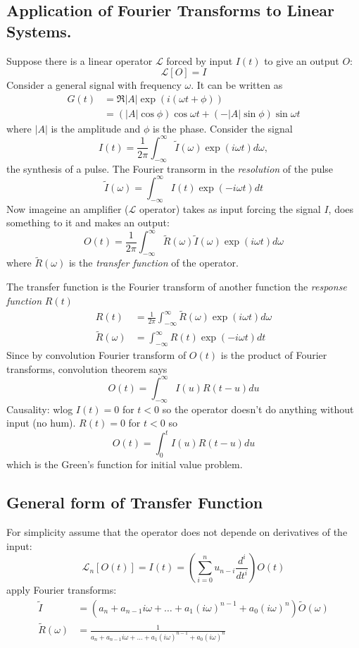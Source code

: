 \documentclass[a4paper]{article}
\renewcommand*{\L}{\mathcal{L}}
\newcommand*{\ft}{\tilde}
\begin{document}
\subsection{Application of Fourier Transforms to Linear Systems.}

Suppose there is a linear operator \(\L\) forced by input \(I(t)\) to give an output \(O\):
\[
  \L[O] = I
\]
Consider a general signal with frequency \(\omega\). It can be written as
\begin{align*}
  G(t) &= \Re |A| \exp(i(\omega t + \phi)) \\
       &= (|A| \cos \phi) \cos \omega t + (- |A| \sin \phi) \sin \omega t
\end{align*}
where \(|A|\) is the amplitude and \(\phi\) is the phase. Consider the signal
\[
  I(t) = \frac{1}{2\pi} \int_{-\infty}^{\infty} \ft I(\omega) \exp(i\omega t) d\omega,
\]
the synthesis of a pulse. The Fourier transorm in the \emph{resolution} of the pulse
\[
  \ft I(\omega) = \int_{-\infty}^{\infty} I(t) \exp(-i\omega t) dt
\]
Now imageine an amplifier (\(\L\) operator) takes as input forcing the signal \(I\), does something to it and makes an output:
\[
  O(t) = \frac{1}{2\pi} \int_{-\infty}^{\infty} \ft R(\omega) \ft I(\omega) \exp(i\omega t) d\omega
\]
where \(\ft R(\omega)\) is the \emph{transfer function} of the operator.

The transfer function is the Fourier transform of another function the \emph{response function} \(R(t)\)
\begin{align*}
  R(t) &= \frac{1}{2\pi} \int_{-\infty}^{\infty} \ft R(\omega) \exp(i\omega t) d\omega \\
  \ft R(\omega) &= \int_{-\infty}^{\infty} R(t) \exp(-i\omega t) dt
\end{align*}
Since by convolution Fourier transform of \(O(t)\) is the product of Fourier transforms, convolution theorem says
\[
  O(t) = \int_{-\infty}^{\infty} I(u) R(t - u) du
\]
Causality: wlog \(I(t) = 0\) for \(t < 0\) so the operator doesn't do anything without input (no hum). \(R(t) = 0\) for \(t < 0\) so
\[
  O(t) = \int_{0}^{t} I(u) R(t - u) du
\]
which is the Green's function for initial value problem.

\subsection{General form of Transfer Function}

For simplicity assume that the operator does not depende on derivatives of the input:
\[
  \L_n[O(t)] = I(t) = \left( \sum_{i = 0}^{n} u_{n - i} \frac{d^i}{dt^i} \right) O(t)
\]
apply Fourier transforms:
\begin{align*}
  \ft I &= \left( a_n + a_{n - 1} i \omega + \dots + a_1(i\omega)^{n - 1} + a_0 (i\omega)^n \right) \ft O(\omega) \\
  \ft R(\omega) &= \frac{1}{a_n + a_{n - 1} i \omega + \dots + a_1(i\omega)^{n - 1} + a_0 (i\omega)^n}
\end{align*}
\end{document}
